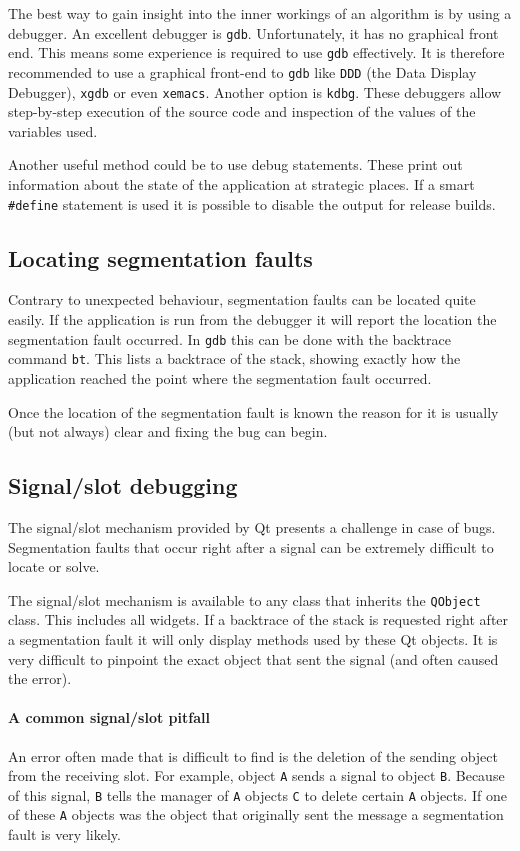 The best way to gain insight into the inner workings of an algorithm is by
using a debugger. An excellent debugger is \verb=gdb=. Unfortunately, it has no
graphical front end. This means some experience is required to use \verb=gdb=
effectively. It is therefore recommended to use a graphical front-end to
\verb=gdb= like \verb=DDD= (the Data Display Debugger), \verb=xgdb= or even \verb=xemacs=.
Another option is \verb=kdbg=. These debuggers allow step-by-step execution of
the source code and inspection of the values of the variables used.


\bigskip \noindent
Another useful method could be to use debug statements. These print out
information about the state of the application at strategic places. If a smart
\verb=#define= statement is used it is possible to disable the output for
release builds.

\subsection{Locating segmentation faults}
Contrary to unexpected behaviour, segmentation faults can be located quite
easily. If the application is run from the debugger it will report the location
the segmentation fault occurred. In \verb=gdb= this can be done with the
backtrace command \verb=bt=. This lists a backtrace of the stack, showing
exactly how the application reached the point where the segmentation fault
occurred.

Once the location of the segmentation fault is known the reason for it is
usually (but not always) clear and fixing the bug can begin.

\subsection{Signal/slot debugging}
The signal/slot mechanism provided by Qt presents a challenge in case of bugs.
Segmentation faults that occur right after a signal can be extremely difficult
to locate or solve.

The signal/slot mechanism is available to any class that inherits the
\verb=QObject= class. This includes all widgets. If a backtrace of the stack is
requested right after a segmentation fault it will only display methods used by
these Qt objects. It is very difficult to pinpoint the exact object that sent
the signal (and often caused the error).

\paragraph{A common signal/slot pitfall\\ }
An error often made that is difficult to find is the deletion of the sending
object from the receiving slot. For example, object \verb=A= sends a signal to
object \verb=B=. Because of this signal, \verb=B= tells the manager of \verb=A=
objects \verb=C= to delete certain \verb=A= objects. If one of these \verb=A=
objects was the object that originally sent the message a segmentation fault is
very likely.

